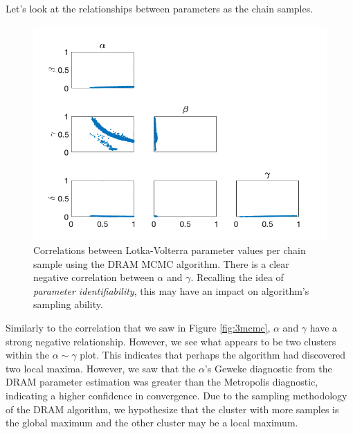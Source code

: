 \par Let's look at the relationships between parameters as the chain samples.
\begin{figure}[H]
    \centering
    \includegraphics[width=15cm]{MCMC_figs/met_lv_final/final_dram_samples.png}
    \caption{Correlations between Lotka-Volterra parameter values per chain sample using the DRAM MCMC algorithm. There is a clear negative correlation between $\alpha$ and $\gamma$. Recalling the idea of \textit{parameter identifiability}, this may have an impact on algorithm's sampling ability.}
    \label{fig:8mcmc}
\end{figure}
Similarly to the correlation that we saw in Figure \ref{fig:3mcmc}, $\alpha$ and $\gamma$ have a strong negative relationship. However, we see what appears to be two clusters within the $\alpha \sim \gamma$ plot. This indicates that perhaps the algorithm had discovered two local maxima. However, we saw that the $\alpha$'s Geweke diagnostic from the DRAM parameter estimation was greater than the Metropolis diagnostic, indicating a higher confidence in convergence. Due to the sampling methodology of the DRAM algorithm, we hypothesize that the cluster with more samples is the global maximum and the other cluster may be a local maximum.
